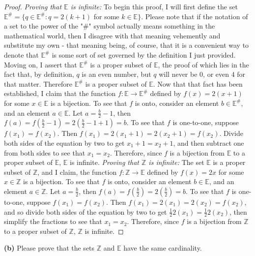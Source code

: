 \documentclass[12pt]{article}
\begin{document}
\begin{proof}
\textit{Proving that $\mathbb{E}$ is infinite:} To begin this proof, I will first define the set $\mathbb{E}^\# = \{q \in\mathbb{E}^\# : q=2(k+1)$ for some $k \in\mathbb{E}\}$. Please note that if the notation of a set to the power of the "\#" symbol actually means something in the mathematical world, then I disagree with that meaning vehemently and substitute my own - that meaning being, of course, that it is a convenient way to denote that $\mathbb{E}^\#$ is some sort of set governed by the definition I just provided. Moving on, I assert that $\mathbb{E}^\#$ is a proper subset of $\mathbb{E}$, the proof of which lies in the fact that, by definition, $q$ is an even number, but $q$ will never be $0$, or even $4$ for that matter. Therefore $\mathbb{E}^\#$ is a proper subset of $\mathbb{E}$. Now that that fact has been established, I claim that the function $f:\mathbb{E}\rightarrow \mathbb{E}^\#$ defined by  $f(x)=2(x+1)$ for some $x \in\mathbb{E}$ is a bijection. To see that $f$ is onto, consider an element $b \in\mathbb{E}^\#$, and an element $a \in\mathbb{E}$. Let $a = \frac{b}{2} - 1$, then $f(a)=f(\frac{b}{2}-1)=2(\frac{b}{2}-1+1)=b$. To see that $f$ is one-to-one, suppose $f(x_1)=f(x_2)$. Then $f(x_1)=2(x_1 + 1) = 2(x_2 + 1) = f(x_2)$. Divide both sides of the equation by two to get $x_1 +1 = x_2 + 1$, and then subtract one from both sides to see that $x_1 = x_2$. Therefore, since $f$ is a bijection from $\mathbb{E}$ to a proper subset of $\mathbb{E}$, $\mathbb{E}$ is infinite.
\newline
\newline
\textit{Proving that $\mathbb{Z}$ is infinite:} The set $\mathbb{E}$ is a proper subset of $\mathbb{Z}$, and I claim, the function $f:\mathbb{Z} \rightarrow \mathbb{E}$ defined by $f(x)=2x$ for some $x \in\mathbb{Z}$ is a bijection. To see that $f$ is onto, consider an element $b \in\mathbb{E}$, and an element $a \in\mathbb{Z}$. Let $a = \frac{b}{2}$, then $f(a)=f(\frac{b}{2})=2(\frac{b}{2}) = b$. To see that $f$ is one-to-one, suppose $f(x_1)=f(x_2)$. Then $f(x_1)=2(x_1) = 2(x_2) = f(x_2)$, and so divide both sides of the equation by two to get $\frac{1}{2}2(x_1) = \frac{1}{2}2(x_2)$, then simplify the fractions to see that $x_1=x_2$. Therefore, since $f$ is a bijection from $\mathbb{Z}$ to a proper subset of $\mathbb{Z}$, $\mathbb{Z}$ is infinite.
\end{proof}

\begin{description}
\item \textbf{(b)} Please prove that the sets $\mathbb{Z}$ and $\mathbb{E}$ have the same cardinality.
\end{description}
\end{document}
